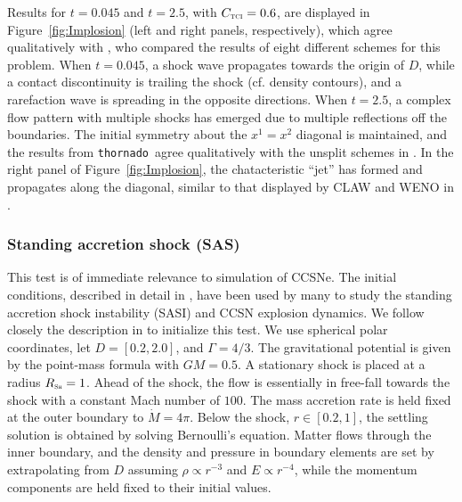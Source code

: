 \documentclass[letterpaper]{jpconf}
\newcommand{\TCI}{\textnormal{\tiny\textsc{TCI}}}
\newcommand{\shock}{\textnormal{\tiny\textsc{Sh}}}
\newcommand{\thornado}{\texttt{thornado}}
\begin{document}
Results for $t=0.045$ and $t=2.5$, with $C_{\TCI}=0.6$, are displayed in Figure~\ref{fig:Implosion} (left and right panels, respectively), which agree qualitatively with \cite{liskaWendroff_2003}, who compared the results of eight different schemes for this problem.  
When $t=0.045$, a shock wave propagates towards the origin of $D$, while a contact discontinuity is trailing the shock (cf. density contours), and a rarefaction wave is spreading in the opposite directions.  
When $t=2.5$, a complex flow pattern with multiple shocks has emerged due to multiple reflections off the boundaries.  
The initial symmetry about the $x^{1}=x^{2}$ diagonal is maintained, and the results from \thornado\ agree qualitatively with the unsplit schemes in \cite{liskaWendroff_2003}.  
In the right panel of Figure~\ref{fig:Implosion}, the chatacteristic ``jet'' has formed and propagates along the diagonal, similar to that displayed by CLAW and WENO in \cite{liskaWendroff_2003}.  

\subsubsection{Standing accretion shock (SAS)}

This test is of immediate relevance to simulation of CCSNe.  
The initial conditions, described in detail in \cite{blondin_etal_2003}, have been used by many to study the standing accretion shock instability (SASI) and CCSN explosion dynamics.  
We follow closely the description in \cite{blondin_etal_2003} to initialize this test.  
We use spherical polar coordinates, let $D=[0.2,2.0]$, and $\Gamma=4/3$.  
The gravitational potential is given by the point-mass formula with $GM=0.5$.  
A stationary shock is placed at a radius $R_{\shock}=1$.  
Ahead of the shock, the flow is essentially in free-fall towards the shock with a constant Mach number of $100$.  
The mass accretion rate is held fixed at the outer boundary to $\dot{M}=4\pi$.  
Below the shock, $r\in[0.2,1]$, the settling solution is obtained by solving Bernoulli's equation.  
Matter flows through the inner boundary, and the density and pressure in boundary elements are set by extrapolating from $D$ assuming $\rho\propto r^{-3}$ and $E\propto r^{-4}$, while the momentum components are held fixed to their initial values.  
\end{document}
